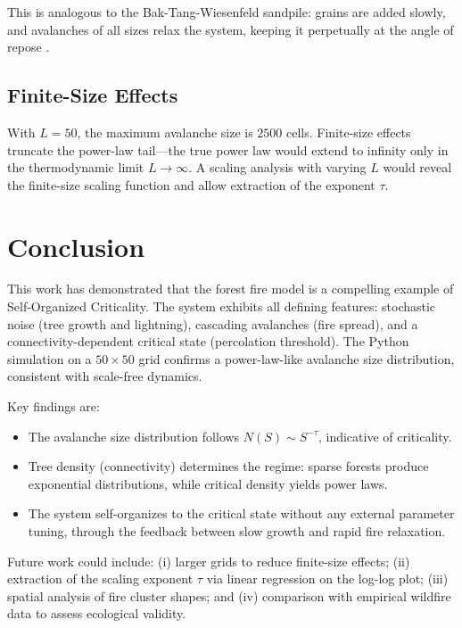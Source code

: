 \documentclass[12pt, a4paper]{article}
\begin{document}
This is analogous to the Bak-Tang-Wiesenfeld sandpile: grains are added slowly, and
avalanches of all sizes relax the system, keeping it perpetually at the angle of
repose \cite{bak1987self}.

\subsection{Finite-Size Effects}

With $L = 50$, the maximum avalanche size is $2500$ cells. Finite-size effects
truncate the power-law tail—the true power law would extend to infinity only in the
thermodynamic limit $L \to \infty$. A scaling analysis with varying $L$ would reveal
the finite-size scaling function and allow extraction of the exponent $\tau$.

\section{Conclusion}
\label{sec:conclusion}

This work has demonstrated that the forest fire model is a compelling example of
Self-Organized Criticality. The system exhibits all defining features: stochastic
noise (tree growth and lightning), cascading avalanches (fire spread), and a
connectivity-dependent critical state (percolation threshold). The Python simulation
on a $50 \times 50$ grid confirms a power-law-like avalanche size distribution,
consistent with scale-free dynamics.

Key findings are:
\begin{itemize}
    \item The avalanche size distribution follows $N(S) \sim S^{-\tau}$, indicative
    of criticality.
    \item Tree density (connectivity) determines the regime: sparse forests produce
    exponential distributions, while critical density yields power laws.
    \item The system self-organizes to the critical state without any external
    parameter tuning, through the feedback between slow growth and rapid fire
    relaxation.
\end{itemize}

Future work could include: (i) larger grids to reduce finite-size effects; (ii)
extraction of the scaling exponent $\tau$ via linear regression on the log-log plot;
(iii) spatial analysis of fire cluster shapes; and (iv) comparison with empirical
wildfire data to assess ecological validity.
\end{document}
